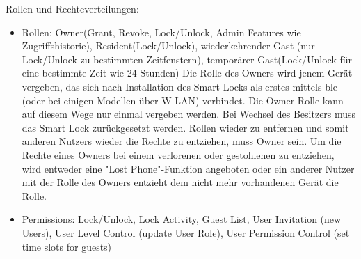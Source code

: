         Rollen und Rechteverteilungen\cite{Ye2017}\cite{Ho2016}:
		\begin{itemize}
			\item Rollen: Owner(Grant, Revoke, Lock/Unlock, Admin Features wie Zugriffshistorie), Resident(Lock/Unlock), wiederkehrender Gast (nur Lock/Unlock zu bestimmten Zeitfenstern), temporärer Gast(Lock/Unlock für eine bestimmte Zeit wie 24 Stunden)
			    Die Rolle des Owners wird jenem Gerät vergeben, das sich nach Installation des Smart Locks als erstes mittels \gls{ble} (oder bei einigen Modellen über W-LAN) verbindet.
			    Die Owner-Rolle kann auf diesem Wege nur einmal vergeben werden.
			    Bei Wechsel des Besitzers muss das Smart Lock zurückgesetzt werden.
			    Rollen wieder zu entfernen und somit anderen Nutzers wieder die Rechte zu entziehen, muss Owner sein.
			    Um die Rechte eines Owners bei einem verlorenen oder gestohlenen zu entziehen, wird entweder eine "Lost Phone"-Funktion angeboten oder ein anderer Nutzer mit der Rolle des Owners entzieht dem nicht mehr vorhandenen Gerät die Rolle.
			\item Permissions: Lock/Unlock, Lock Activity, Guest List, User Invitation (new Users), User Level Control (update User Role), User Permission Control (set time slots for guests)
		\end{itemize}
